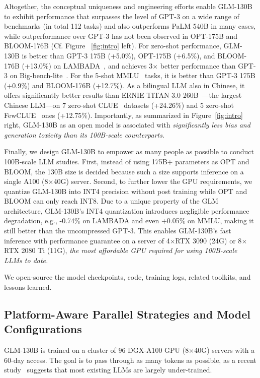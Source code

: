 Altogether, the conceptual uniqueness and engineering efforts enable GLM-130B to exhibit performance that surpasses the level of GPT-3 on a wide range of benchmarks (in total 112 tasks) and also outperforms PaLM 540B in many cases, while outperformance over GPT-3 has not been observed in OPT-175B and BLOOM-176B (Cf. Figure ~\ref{fig:intro} left). For zero-shot performance, GLM-130B is better than GPT-3 175B (+5.0\%), OPT-175B (+6.5\%), and BLOOM-176B (+13.0\%) on LAMBADA~\citep{paperno2016lambada}, and achieves 3$\times$ better performance than GPT-3 on Big-bench-lite~\citep{srivastava2022beyond}. For the 5-shot MMLU~\citep{hendrycks2021measuring} tasks, it is  better than GPT-3 175B (+0.9\%) and BLOOM-176B (+12.7\%). 
As a bilingual LLM also in Chinese, it offers significantly better results than ERNIE TITAN 3.0 260B~\citep{wang2021ernie}---the largest Chinese LLM---on 7 zero-shot CLUE~\citep{xu2020clue} datasets (+24.26\%) and 5 zero-shot FewCLUE~\citep{xu2021fewclue} ones (+12.75\%). 
Importantly, as summarized in Figure~\ref{fig:intro} right, GLM-130B as an open model is associated with \textit{significantly less bias and generation toxicity than its 100B-scale counterparts}. 

Finally, we design GLM-130B to empower as many people as possible to conduct 100B-scale LLM studies. First, instead of using 175B+ parameters as OPT and BLOOM, the 130B size is decided because such a size supports inference on a single A100 (8$\times$40G) server. Second, to further lower the GPU requirements, we quantize GLM-130B into INT4 precision without post training  while OPT and BLOOM can only reach INT8. Due to a unique property of the GLM architecture, GLM-130B's INT4 quantization introduces negligible performance degradation, e.g., -0.74\% on LAMBADA and even +0.05\% on MMLU, making it still better than the uncompressed GPT-3. This enables GLM-130B's fast inference with performance guarantee on a server of 4$\times$RTX 3090 (24G) or 8$\times$RTX 2080 Ti (11G), \textit{the most affordable GPU required for using 100B-scale LLMs to date. }

We open-source the model checkpoints, code, training logs, related toolkits, and lessons learned. 

\subsection{Platform-Aware Parallel Strategies and Model Configurations} \label{sec:parallel_strategy}

GLM-130B is trained on a cluster of 96 DGX-A100 GPU (8$\times$40G) servers with a 60-day access. The goal is to pass through as many tokens as possible, as a recent study~\citep{hoffmann2022training} suggests that most existing LLMs are largely under-trained. 

